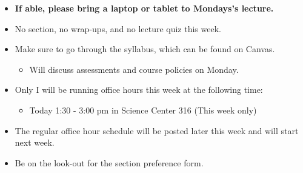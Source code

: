 \documentclass[
  letterpaper,
  DIV=11,
  numbers=noendperiod]{scrartcl}
\providecommand{\tightlist}{%
  \setlength{\itemsep}{0pt}\setlength{\parskip}{0pt}}\usepackage{longtable,booktabs,array}
\begin{document}
\begin{itemize}
\item
  \textbf{If able, please bring a laptop or tablet to Mondays's
  lecture.}
\item
  No section, no wrap-ups, and no lecture quiz this week.
\item
  Make sure to go through the syllabus, which can be found on Canvas.

  \begin{itemize}
  \tightlist
  \item
    Will discuss assessments and course policies on Monday.
  \end{itemize}
\item
  Only I will be running office hours this week at the following time:

  \begin{itemize}
  \tightlist
  \item
    Today 1:30 - 3:00 pm in Science Center 316 (This week only)
  \end{itemize}
\item
  The regular office hour schedule will be posted later this week and
  will start next week.
\item
  Be on the look-out for the section preference form.
\end{itemize}
\end{document}
